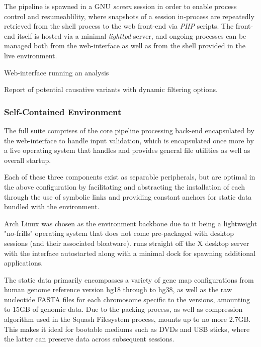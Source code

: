 The pipeline is spawned in a GNU \textit{screen} session in order to enable process control and resumeablility, where snapshots of a session in-process are repeatedly retrieved from the shell process to the web front-end via \textit{PHP} scripts. The front-end itself is hosted via a minimal \textit{lighttpd} server, and ongoing \app processes can be managed both from the web-interface as well as from the shell provided in the live environment.


{Web-interface running an analysis}

{Report of potential causative variants with dynamic filtering options.}



\subsubsection{Self-Contained Environment}

The full \app suite comprises of the core pipeline processing back-end encapsulated by the web-interface to handle input validation, which is encapsulated once more by a live operating system that handles and provides general file utilities as well as overall startup.

Each of these three components exist as separable peripherals, but are optimal in the above configuration by facilitating and abstracting the installation of each through the use of symbolic links and providing constant anchors for static data bundled with the environment.

Arch Linux was chosen as the environment backbone due to it being a lightweight "no-frills" operating system that does not come pre-packaged with desktop sessions (and their associated bloatware). \app runs straight off the X desktop server with the \app interface autostarted along with a minimal dock for spawning additional applications.

The static data primarily encompasses a variety of gene map configurations from human genome reference version hg18 through to hg38, as well as the raw nucleotide FASTA files for each chromosome specific to the versions, amounting to 15GB of genomic data. Due to the packing process, as well as compression algorithm used in the Squash Filesystem process, \app mounts up to no more 2.7GB. This makes it ideal for bootable mediums such as DVDs and USB sticks, where the latter can preserve data across subsequent sessions.

